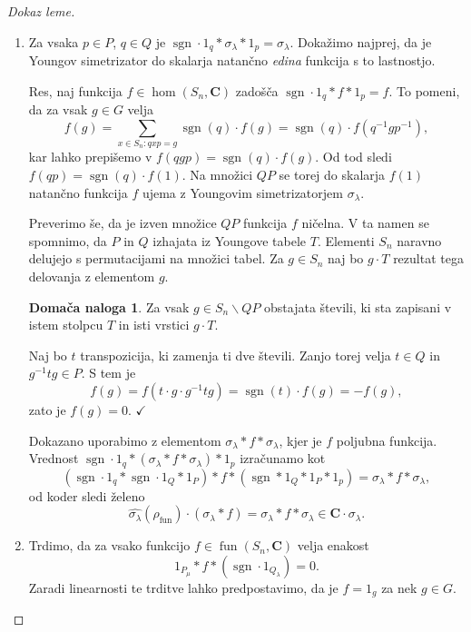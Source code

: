 \documentclass[11pt]{book}
\def\CC{\mathbf{C}}
\def\youngsym{\sigma_{\lambda}}
\DeclareMathOperator\sgn{sgn}
\DeclareMathOperator\fun{fun}
\def\kljuka{$\checkmark$}
\theoremstyle{definition}
\theoremstyle{zgled}
\theoremstyle{odprtproblem}
\theoremstyle{domacanaloga}
\newtheorem*{domacanaloga}{Domača naloga}
\newenvironment{dokaz}
    {\color{siva}\begin{proof}}
    {\end{proof}}
\theoremstyle{izrek}
\begin{document}
\begin{dokaz}[Dokaz leme] \leavevmode
\begin{enumerate}
    \item Za vsaka $p \in P$, $q \in Q$ je $\sgn \cdot 1_q * \youngsym * 1_p = \youngsym$. Dokažimo najprej, da je Youngov simetrizator do skalarja natančno \emph{edina} funkcija s to lastnostjo. 
    
    Res, naj funkcija $f \in \hom(S_n, \CC)$ zadošča $\sgn \cdot 1_q * f * 1_p = f$. To pomeni, da za vsak $g \in G$ velja
    \[
        f(g) = \sum_{x \in S_n \colon q x p = g} \sgn(q) \cdot f(g) = \sgn(q) \cdot f(q^{-1} g p^{-1}),
    \]
    kar lahko prepišemo v $f(qgp) = \sgn(q) \cdot f(g)$. Od tod sledi $f(qp) = \sgn(q) \cdot f(1)$. Na množici $QP$ se torej do skalarja $f(1)$ natančno funkcija $f$ ujema z Youngovim simetrizatorjem $\youngsym$. 
    
    Preverimo še, da je izven množice $QP$ funkcija $f$ ničelna. V ta namen se spomnimo, da $P$ in $Q$ izhajata iz Youngove tabele $T$. Elementi $S_n$ naravno delujejo s permutacijami na množici tabel. Za $g \in S_n$ naj bo $g \cdot T$ rezultat tega delovanja z elementom $g$.

    \begin{domacanaloga}
    Za vsak $g \in S_n \backslash QP$ obstajata števili, ki sta zapisani v istem stolpcu $T$ in isti vrstici $g \cdot T$.
    \end{domacanaloga}

    Naj bo $t$ transpozicija, ki zamenja ti dve števili. Zanjo torej velja $t \in Q$ in $g^{-1} t g \in P$. S tem je
    \[
        f(g) = f(t \cdot g \cdot g^{-1} t g) = \sgn(t) \cdot f(g) = - f(g),
    \]
    zato je $f(g) = 0$. \kljuka

    Dokazano uporabimo z elementom $\youngsym * f * \youngsym$, kjer je $f$ poljubna funkcija. Vrednost $\sgn \cdot 1_q * (\youngsym * f * \youngsym) * 1_p$ izračunamo kot
    \[
        (\sgn \cdot 1_q * \sgn \cdot 1_Q * 1_P) * f * (\sgn * 1_Q * 1_P * 1_p) =
        \youngsym * f * \youngsym,
    \]
    od koder sledi želeno
    \[
        \widehat{\youngsym}(\rho_{\fun}) \cdot (\youngsym * f) = \youngsym * f * \youngsym \in \CC \cdot \youngsym.
    \]

    \item Trdimo, da za vsako funkcijo $f \in \fun(S_n, \CC)$ velja enakost
    \[    
        1_{P_\mu} * f * (\sgn \cdot 1_{Q_{\lambda}}) = 0.
    \]
    Zaradi linearnosti te trditve lahko predpostavimo, da je $f = 1_g$ za nek $g \in G$. 
    

\end{enumerate}
\end{dokaz}
\end{document}
